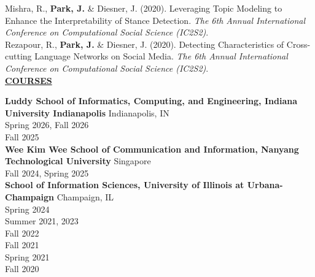 \documentclass{article}
\begin{document}
\noindent Mishra, R., \textbf{Park, J.} \& Diesner, J. (2020). Leveraging Topic Modeling to Enhance the Interpretability of Stance Detection. \textit{The 6th Annual International Conference on Computational Social Science (IC2S2)}. \\

\noindent Rezapour, R., \textbf{Park, J.} \& Diesner, J. (2020). Detecting Characteristics of Cross-cutting Language Networks on Social Media. \textit{The 6th Annual International Conference on Computational Social Science (IC2S2)}. \\


\noindent \textbf{\underline{COURSES}} 

\noindent \textbf{Luddy School of Informatics, Computing, and Engineering, Indiana University Indianapolis} \hfill Indianapolis, IN \\
 \hfill Spring 2026, Fall 2026 \\
 \hfill Fall 2025 \\

\noindent \textbf{Wee Kim Wee School of Communication and Information, Nanyang Technological University} \hfill Singapore \\
 \hfill Fall 2024, Spring 2025 \\

\noindent \textbf{School of Information Sciences, University of Illinois at Urbana-Champaign} \hfill Champaign, IL \\
 \hfill Spring 2024 \\
 \hfill Summer 2021, 2023 \\
 \hfill Fall 2022 \\
 \hfill Fall 2021 \\
 \hfill Spring 2021 \\
 \hfill Fall 2020 \\
\end{document}

